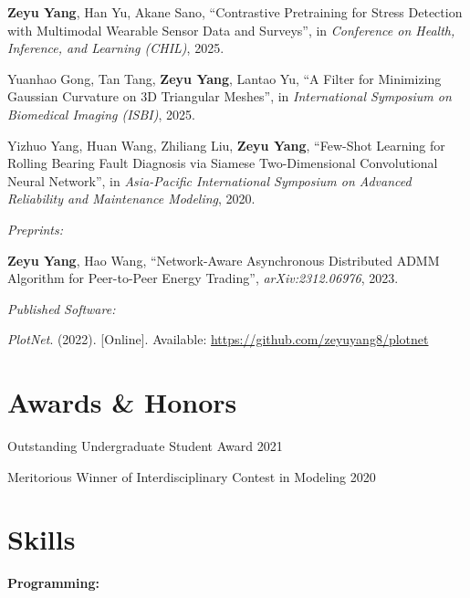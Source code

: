 \documentclass[11pt]{article}
\begin{document}
\begin{enumerate}[resume, label={[\arabic*]}]
    \item \label{akane-clsp} \textbf{Zeyu Yang}, Han Yu, Akane Sano, ``Contrastive Pretraining for Stress Detection with Multimodal Wearable Sensor Data and Surveys'', in \textit{Conference on Health, Inference, and Learning (CHIL)}, 2025.
    \item Yuanhao Gong, Tan Tang, \textbf{Zeyu Yang}, Lantao Yu, ``A Filter for Minimizing Gaussian Curvature on 3D Triangular Meshes'', in \textit{International Symposium on Biomedical Imaging (ISBI)}, 2025.
    \item Yizhuo Yang, Huan Wang, Zhiliang Liu, \textbf{Zeyu Yang}, 
    ``Few-Shot Learning for Rolling Bearing Fault Diagnosis via Siamese Two-Dimensional Convolutional Neural Network'', 
    in \textit{Asia-Pacific International Symposium on Advanced Reliability and Maintenance Modeling}, 2020.
\end{enumerate}

\textit{Preprints:}

\begin{enumerate}[resume, label={[\arabic*]}]
    \item \label{hao-admm} \textbf{Zeyu Yang}, Hao Wang, 
    ``Network-Aware Asynchronous Distributed ADMM Algorithm for Peer-to-Peer Energy Trading'', \textit{arXiv:2312.06976}, 2023.
\end{enumerate}

\vspace{\lineskip}

\textit{Published Software:}

\begin{enumerate}[resume, label={[\arabic*]}]
    \item \label{joe-plotnet} \textit{PlotNet}. (2022). [Online]. Available: \url{https://github.com/zeyuyang8/plotnet}
\end{enumerate}

\section*{Awards \& Honors}

Outstanding Undergraduate Student Award \hfill 2021

Meritorious Winner of Interdisciplinary Contest in Modeling \hfill 2020

\section*{Skills}
\textbf{Programming:}
\end{document}
